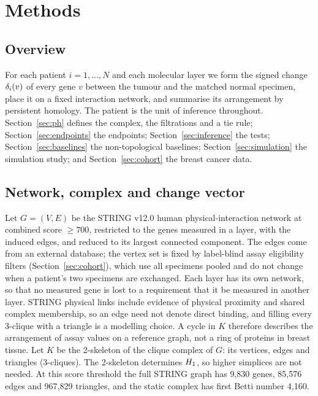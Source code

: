 \section{Methods}\label{sec:methods}

\subsection{Overview}\label{sec:overview}
For each patient $i=1,\dots,N$ and each molecular layer we form the signed change $\delta_i(v)$ of every gene $v$ between the tumour and the matched normal specimen, place it on a fixed interaction network, and summarise its arrangement by persistent homology. The patient is the unit of inference throughout. Section~\ref{sec:ph} defines the complex, the filtrations and a tie rule; Section~\ref{sec:endpoints} the endpoints; Section~\ref{sec:inference} the tests; Section~\ref{sec:baselines} the non-topological baselines; Section~\ref{sec:simulation} the simulation study; and Section~\ref{sec:cohort} the breast cancer data.

\subsection{Network, complex and change vector}\label{sec:network}
Let $G=(V,E)$ be the STRING v12.0 human physical-interaction network \citep{szklarczyk2023} at combined score $\ge 700$, restricted to the genes measured in a layer, with the induced edges, and reduced to its largest connected component. The edges come from an external database; the vertex set is fixed by label-blind assay eligibility filters (Section~\ref{sec:cohort}), which use all specimens pooled and do not change when a patient's two specimens are exchanged. Each layer has its own network, so that no measured gene is lost to a requirement that it be measured in another layer. STRING physical links include evidence of physical proximity and shared complex membership, so an edge need not denote direct binding, and filling every 3-clique with a triangle is a modelling choice. A cycle in $K$ therefore describes the arrangement of assay values on a reference graph, not a ring of proteins in breast tissue. Let $K$ be the 2-skeleton of the clique complex of $G$: its vertices, edges and triangles (3-cliques). The 2-skeleton determines $H_{1}$, so higher simplices are not needed. At this score threshold the full STRING graph has 9{,}830 genes, 85{,}576 edges and 967{,}829 triangles, and the static complex has first Betti number 4{,}160.

